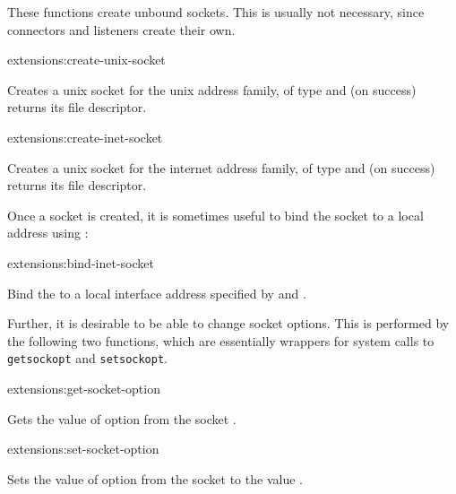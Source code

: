 These functions create unbound sockets. This is usually not necessary,
since connectors and listeners create their own.

\begin{defun}{extensions:}{create-unix-socket}{%
    }
  
  Creates a unix socket for the unix address family, of type
   and (on success) returns its file descriptor.

\end{defun}

\begin{defun}{extensions:}{create-inet-socket}{%
    }
  
  Creates a unix socket for the internet address family, of type
   and (on success) returns its file descriptor.

\end{defun}
\bigskip

Once a socket is created, it is sometimes useful to bind the socket to a 
local address using :

\begin{defun}{extensions:}{bind-inet-socket}{%
  }

  Bind the  to a local interface address specified
  by  and . 

\end{defun}
\bigskip

Further, it is desirable to be able to change socket options. This is
performed by the following two functions, which are essentially
wrappers for system calls to {\tt getsockopt} and {\tt setsockopt}.

\begin{defun}{extensions:}{get-socket-option}{%
    }
  
  Gets the value of option  from the socket .

\end{defun}

\begin{defun}{extensions:}{set-socket-option}{%
    }
  
  Sets the value of option  from the socket 
  to the value .

\end{defun}
\bigskip

